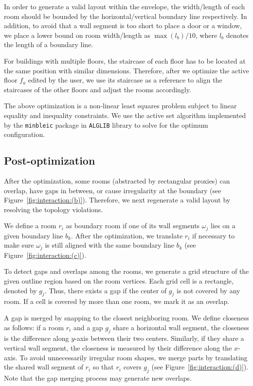 In order to generate a valid layout within the envelope, the width/length of each room should be bounded by the horizontal/vertical boundary line respectively. In addition, to avoid that a wall segment is too short to place a door or a window, we place a lower bound on room width/length as ${\max(l_b)}/{10}$, where $l_b$ denotes the length of a boundary line.

For buildings with multiple floors, the staircase of each floor has to be located at the same position with similar dimensions. Therefore, after we optimize the active floor $f_a$ edited by the user, we use its staircase as a reference to align the staircases of the other floors and adjust the rooms accordingly.

The above optimization is a non-linear least squares problem subject to linear equality and inequality constraints. We use the active set algorithm implemented by the \texttt{minbleic} package in \texttt{ALGLIB} library to solve for the optimum configuration.

\subsection{Post-optimization}

After the optimization, some rooms (abstracted by rectangular proxies) can overlap, have gaps in between, or cause irregularity at the boundary (see Figure~\ref{fig:interaction:(b)}). Therefore, we next regenerate a valid layout by resolving the topology violations.

We define a room $r_i$ as boundary room if one of its wall segments $\omega_j$ lies on a given boundary line $b_k$. After the optimization, we translate $r_i$ if necessary to make sure $\omega_j$ is still aligned with the same boundary line $b_k$ (see Figure~\ref{fig:interaction:(c)}).

To detect gaps and overlaps among the rooms, we generate a grid structure of the given outline region based on the room vertices. Each grid cell is a rectangle, denoted by $g_j$.
Thus, there exists a gap if the center of $g_j$ is not covered by any room. If a cell is covered by more than one room, we mark it as an overlap.

A gap is merged by snapping to the closest neighboring room. We define closeness as follows: if a room $r_i$ and a gap $g_j$ share a horizontal wall segment, the closeness is the difference along $y$-axis between their two centers. Similarly, if they share a vertical wall segment, the closeness is measured by their difference along the $x$-axis. To avoid unnecessarily irregular room shapes, we merge parts by translating the shared wall segment of $r_i$ so that $r_i$ covers $g_j$ (see Figure~\ref{fig:interaction:(d)}). Note that the gap merging process may generate new overlaps.

